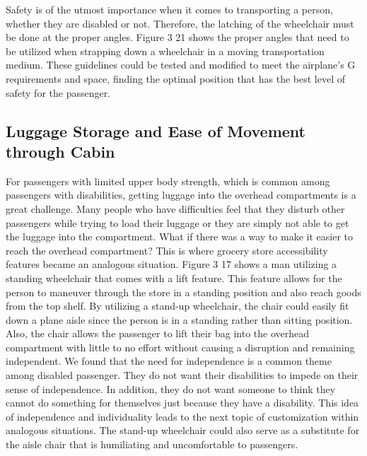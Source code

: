 Safety is of the utmost importance when it comes to transporting a person, whether they are disabled or not. Therefore, the latching of the wheelchair must be done at the proper angles. Figure 3 21 shows the proper angles that need to be utilized when strapping down a wheelchair in a moving transportation medium.  These guidelines could be tested and modified to meet the airplane's G requirements and space, finding the optimal position that has the best level of safety for the passenger.

\subsection{Luggage Storage and Ease of Movement through Cabin}
For passengers with limited upper body strength, which is common among passengers with disabilities, getting luggage into the overhead compartments is a great challenge.  Many people who have difficulties feel that they disturb other passengers while trying to load their luggage or they are simply not able to get the luggage into the compartment. What if there was a way to make it easier to reach the overhead compartment? This is where grocery store accessibility features became an analogous situation.  Figure 3 17 shows a man utilizing a standing wheelchair that comes with a lift feature.  This feature allows for the person to maneuver through the store in a standing position and also reach goods from the top shelf.  By utilizing a stand-up wheelchair, the chair could easily fit down a plane aisle since the person is in a standing rather than sitting position.  Also, the chair allows the passenger to lift their bag into the overhead compartment with little to no effort without causing a disruption and remaining independent. We found that the need for independence is a common theme among disabled passenger. They do not want their disabilities to impede on their sense of independence. In addition, they do not want someone to think they cannot do something for themselves just because they have a disability. This idea of independence and individuality leads to the next topic of customization within analogous situations.  The stand-up wheelchair could also serve as a substitute for the aisle chair that is humiliating and uncomfortable to passengers. 

